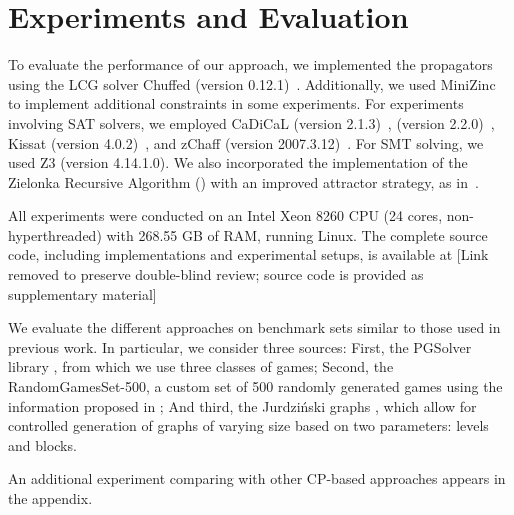 \documentclass[letterpaper]{article} %
\begin{document}
\section{Experiments and Evaluation}\label{sec:experiments}

To evaluate the performance of our approach, we implemented the \noc propagators using the LCG solver Chuffed (version 0.12.1)~\cite{chuffed:2018}. Additionally, we used MiniZinc~\cite{DBLP:conf/cp/NethercoteSBBDT07} to implement additional constraints in some experiments. For experiments involving SAT solvers, we employed CaDiCaL (version 2.1.3)~\cite{Biere:Cadical:2024},  (version 2.2.0)~\cite{Een:MiniSat:2003}, Kissat (version 4.0.2)~\cite{Biere:Kissat:2024}, and zChaff (version 2007.3.12)~\cite{Moskewicz:zChaff:2001}. For SMT solving, we used Z3 (version 4.14.1.0). We also incorporated the implementation of the Zielonka Recursive Algorithm (\zra) with an improved attractor strategy, as in~\cite{Aggarwal:2023}.

All experiments were conducted on an Intel Xeon 8260 CPU (24 cores, non-hyperthreaded) with 268.55 GB of RAM, running Linux. The complete source code, including implementations and experimental setups, is available at [Link removed to preserve double-blind review; source code is provided as supplementary material]

We evaluate the different approaches on benchmark sets similar to those used in previous work. In particular, we consider three sources:
First, the PGSolver library \cite{Friedmann:2017}, from which we use three classes of games;
Second, the RandomGamesSet-500, a custom set of 500 randomly generated games using the information proposed in \cite{Friedmann:2017};
And third, the Jurdziński graphs \cite{Jurdziński:2022,Keiren:2015}, which allow for controlled generation of graphs of varying size based on two parameters: levels and blocks. 

An additional experiment comparing \noc with other CP-based approaches appears in the appendix.
\end{document}
